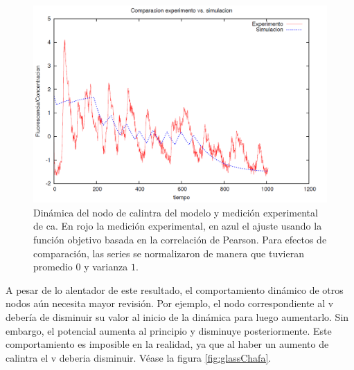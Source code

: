 \begin{figure}[h]
\includegraphics[width=0.9\linewidth]{gfx/glassChido}
\caption[Dinámica del nodo de \ac{calintra} del modelo y medición experimental de \ac{ca}]{Dinámica del nodo de \ac{calintra} del modelo y medición experimental de \ac{ca}. En rojo la medición experimental, en azul el ajuste usando la función objetivo basada en la correlación de Pearson. Para efectos de comparación, las series se normalizaron de manera que tuvieran promedio $0$ y varianza $1$.}\label{fig:glassChido}
\end{figure}

A pesar de lo alentador de este resultado, el comportamiento dinámico de otros nodos aún necesita mayor revisión. Por ejemplo, el nodo correspondiente al \acf{v} debería de disminuir su valor al inicio de la dinámica para luego aumentarlo. Sin embargo, el potencial aumenta al principio y disminuye posteriormente. Este comportamiento es imposible en la realidad, ya que al haber un aumento de \ac{calintra} el \acf{v} deberia disminuir. Véase la figura \ref{fig:glassChafa}.

